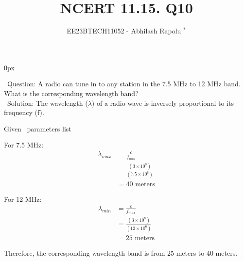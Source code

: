 \documentclass[journal,12pt,twocolumn]{IEEEtran}
\begin{document}


\vspace{3cm}
\title{NCERT 11.15. Q10}
\author{EE23BTECH11052 - Abhilash Rapolu $^{*}$%
}
\maketitle

\newpage
\bigskip
\renewcommand{\thetable}{\arabic{table}}

\parindent 0px

\ Question:
A radio can tune in to any station in the 7.5 MHz to 12 MHz band. What is the corresponding wavelength band?\\
\ Solution:
The wavelength ($\lambda$) of a radio wave is inversely proportional to its frequency (f).

\begin{table}[htbp] \small
\centering

\caption{Given \, parameters list}
\end{table}

For 7.5 MHz:
\begin{align}
\lambda_{max} &= \frac{c}{f_{min}} \\
&= \frac{(3\times10^{8})}{(7.5\times10^{6})} \\
&= 40 \text{ meters}
\end{align}

For 12 MHz:
\begin{align}
\lambda_{min} &= \frac{c}{f_{max}} \\
&= \frac{(3\times10^{8})}{(12\times10^{6})} \\
&= 25 \text{ meters}
\end{align}

Therefore, the corresponding wavelength band is from 25 meters to 40 meters.
\end{document}
